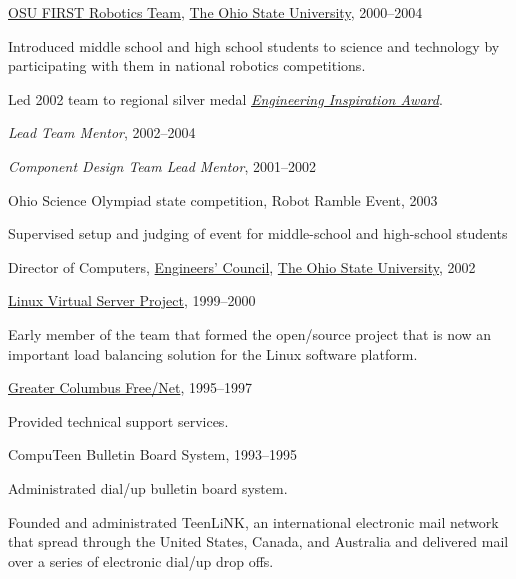 \documentclass[10pt]{article}
\newcommand{\halfblankline}{\quad\vspace{-0.5\baselineskip}\pagebreak[3]}
\begin{document}
\halfblankline

\href{http://www.osufirst.org/}{OSU FIRST Robotics Team},
\href{http://www.osu.edu}{The Ohio State University}, 2000--2004
\begin{innerlist}
\item Introduced middle school and high school students to science and
        technology by participating with them in national robotics
        competitions.
\item Led 2002 team to regional silver medal
        \href{http://www.firstwiki.org/Engineering_Inspiration_Award}
             {\emph{Engineering Inspiration Award}}.
\item \emph{Lead Team Mentor}, 2002--2004
\item \emph{Component Design Team Lead Mentor}, 2001--2002
\end{innerlist}

\halfblankline

Ohio Science Olympiad state competition, Robot Ramble Event, 2003
%
\begin{innerlist}
    \item Supervised setup and judging of event for middle-school and
        high-school students
\end{innerlist}

\halfblankline

Director of Computers,
\href{http://ec.osu.edu/}{Engineers' Council},
\href{http://www.osu.edu/}{The Ohio State University}, 2002

\halfblankline

\href{http://www.linuxvirtualserver.org/}
     {Linux Virtual Server Project}, 1999--2000
\begin{innerlist}
\item Early member of the team that formed the open\-/source project that
        is now an important load balancing solution for the Linux
        software platform.
\end{innerlist}

\halfblankline

\href{http://www.gcfn.org/}
     {Greater Columbus Free\-/Net}, 1995--1997
\begin{innerlist}
\item Provided technical support services.
\end{innerlist}

\halfblankline

CompuTeen Bulletin Board System, 1993--1995
\begin{innerlist}
\item Administrated dial\-/up bulletin board system.
\item Founded and administrated TeenLiNK, an international electronic
        mail network that spread through the United States, Canada, and
        Australia and delivered mail over a series of electronic dial\-/up
        drop offs.
\end{innerlist}
\end{document}
